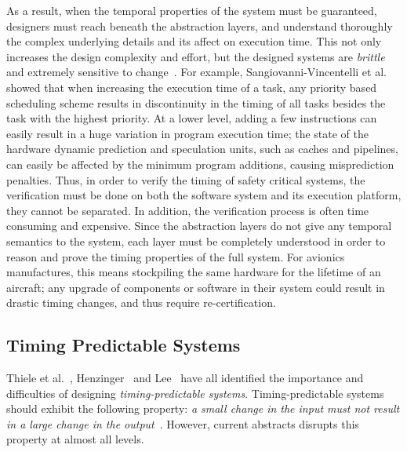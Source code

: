 As a result, when the temporal properties of the system must be guaranteed, designers must reach beneath the abstraction layers, and understand thoroughly the complex underlying details and its affect on execution time. 
This not only increases the design complexity and effort, but the designed systems are \emph{brittle} and extremely sensitive to change~\cite{Sangiovanni-Vincentelli2007automotive, Edwards2007PRETcase}.  
For example, Sangiovanni-Vincentelli et al.\cite{Sangiovanni-Vincentelli2007automotive} showed that when increasing the execution time of a task, any priority based scheduling scheme results in discontinuity in the timing of all tasks besides the task with the highest priority. 
At a lower level, adding a few instructions can easily result in a huge variation in program execution time; the state of the hardware dynamic prediction and speculation units, such as caches and pipelines, can easily be affected by the minimum program additions, causing misprediction penalties.
Thus, in order to verify the timing of safety critical systems, the verification must be done on both the software system and its execution platform, they cannot be separated. 
In addition, the verification process is often time consuming and expensive.
Since the abstraction layers do not give any temporal semantics to the system, each layer must be completely understood in order to reason and prove the timing properties of the full system.  
For avionics manufactures, this means stockpiling the same hardware for the lifetime of an aircraft; any upgrade of components or software in their system could result in drastic timing changes, and thus require re-certification.


\subsection{Timing Predictable Systems}
Thiele et al.~\cite{thiele_et_al:DSP:2004:2}, Henzinger~\cite{Henzinger2008} and Lee~\cite{LeeOnTime2005} have all identified the importance and difficulties of designing \emph{timing-predictable systems}.
Timing-predictable systems should exhibit the following property: \textit{a small change in the input must not result in a large change in the output}~\cite{Henzinger2008}.
However, current abstracts disrupts this property at almost all levels. 

